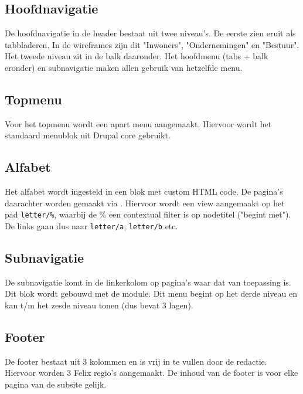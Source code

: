 
\subsection{Hoofdnavigatie}

De hoofdnavigatie in de header bestaat uit twee niveau's. De eerste zien eruit als tabbladeren. In de wireframes zijn dit "Inwoners", "Ondernemingen" en "Bestuur". Het tweede niveau zit in de balk daaronder. Het hoofdmenu (tabs + balk eronder) en subnavigatie maken allen gebruik van hetzelfde menu.

\subsection{Topmenu}

Voor het topmenu wordt een apart menu aangemaakt. Hiervoor wordt het standaard menublok uit Drupal core gebruikt.

\subsection{Alfabet}

Het alfabet wordt ingesteld in een blok met custom HTML code. De pagina's daarachter worden gemaakt via . Hiervoor wordt een view aangemaakt op het pad \texttt{letter/\%}, waarbij de \% een contextual filter is op nodetitel ("begint met"). De links gaan dus naar \texttt{letter/a}, \texttt{letter/b} etc.

\subsection{Subnavigatie}

De subnavigatie komt in de linkerkolom op pagina's waar dat van toepassing is. Dit blok wordt gebouwd met de  module. Dit menu begint op het derde niveau en kan t/m het zesde niveau tonen (dus bevat 3 lagen).

\subsection{Footer}

De footer bestaat uit 3 kolommen en is vrij in te vullen door de redactie. Hiervoor worden 3 Felix regio's aangemaakt. De inhoud van de footer is voor elke pagina van de subsite gelijk.

